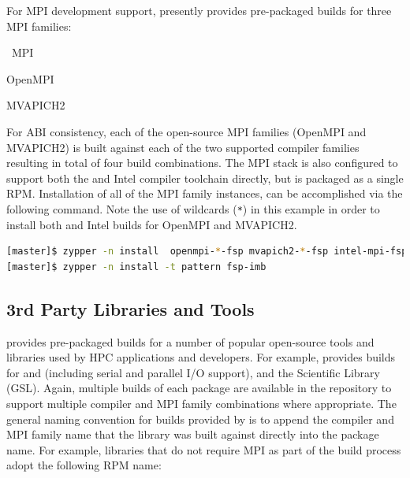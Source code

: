 \documentclass[letterpaper]{article}
\begin{document}
For MPI development support, \FSP{} presently provides pre-packaged builds for
three MPI families: 

\begin{itemize*}
\item \Intel{}~MPI
\item OpenMPI
\item MVAPICH2
\end{itemize*}
 For ABI consistency, each of the open-source MPI families (OpenMPI and
 MVAPICH2) is built against each of the two supported compiler families
 resulting in total of four build combinations.  The \Intel{} MPI stack is also
 configured to support both the \GNU{} and Intel compiler toolchain directly, but
 is packaged as a single RPM. Installation of all of the MPI family instances,
 can be accomplished via the following command. Note the use of wildcards
 (\texttt{*}) in this example in order to install both \GNU{} and Intel builds for
 OpenMPI and MVAPICH2.

\begin{lstlisting}[language=bash]
[master]$ zypper -n install  openmpi-*-fsp mvapich2-*-fsp intel-mpi-fsp
[master]$ zypper -n install -t pattern fsp-imb
\end{lstlisting}



\subsection{3rd Party Libraries and Tools} \label{sec:3rdparty}

\FSP{} provides pre-packaged builds for a number of popular open-source
tools and libraries used by HPC applications and developers. For
example, \FSP{} provides builds for \FFTW{} and \hdffive{} (including serial and parallel
I/O support), and the \GNU{} Scientific Library (GSL). Again, multiple builds of
each package are available in the \FSP{} repository to support multiple compiler
and MPI family combinations where appropriate. The general naming convention
for builds provided by \FSP{} is to append the compiler and MPI family name that
the library was built against directly into the package name. For example,
libraries that do not require MPI as part of the build process adopt the
following RPM name: \\
\end{document}
